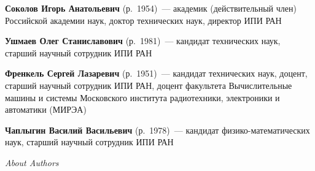 \begin{multicols}{2}
\vspace*{12pt}

\noindent
\textbf{Соколов Игорь Анатольевич} (р.\ 1954)~---  
академик (действительный член) Российской академии наук, 
доктор технических наук,
директор ИПИ РАН

\vspace*{12pt}

\noindent
\textbf{Ушмаев Олег Станиславович} (р.\ 1981)~---  кандидат 
технических наук, старший научный сотрудник ИПИ РАН

\vspace*{12pt}

\noindent
\textbf{Френкель Сергей Лазаревич} (р.\ 1951)~---  кандидат\linebreak
технических наук, 
доцент, старший научный сотрудник ИПИ РАН, доцент факультета 
Вы\-чис\-ли\-тель\-ные машины и системы Московского института радиотехники,
электроники и автоматики (\mbox{МИРЭА})

\vspace*{12pt}

\noindent
\textbf{Чаплыгин Василий Васильевич} (р.\ 1978)~---  
кандидат физико-математических наук,
старший научный сотрудник ИПИ РАН





\end{multicols}
\vspace*{24pt}
\begin{center}\LARGE
\textit{About Authors}
\end{center}
\thispagestyle{empty}

\vspace*{12pt} %


